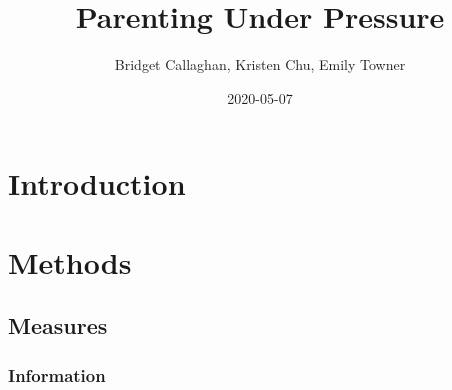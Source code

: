 \documentclass[]{book}
\title{Parenting Under Pressure}
\author{Bridget Callaghan, Kristen Chu, Emily Towner}
\date{2020-05-07}
\begin{document}
\maketitle

{
\setcounter{tocdepth}{1}
\tableofcontents
}
\hypertarget{introduction}{%
\chapter{Introduction}\label{introduction}}

\hypertarget{methods}{%
\chapter{Methods}\label{methods}}

\hypertarget{measures}{%
\section{Measures}\label{measures}}

\hypertarget{information}{%
\subsection{Information}\label{information}}
\end{document}
